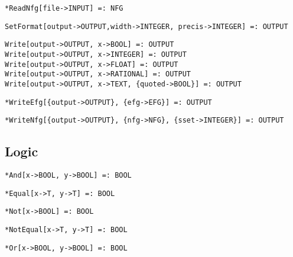 \protect \large \begin{verbatim}
*ReadNfg[file->INPUT] =: NFG
\end{verbatim}\normalsize


\protect \large \begin{verbatim}
SetFormat[output->OUTPUT,width->INTEGER, precis->INTEGER] =: OUTPUT
\end{verbatim}\normalsize


\protect \large \begin{verbatim}
Write[output->OUTPUT, x->BOOL] =: OUTPUT 
Write[output->OUTPUT, x->INTEGER] =: OUTPUT
Write[output->OUTPUT, x->FLOAT] =: OUTPUT
Write[output->OUTPUT, x->RATIONAL] =: OUTPUT
Write[output->OUTPUT, x->TEXT, {quoted->BOOL}] =: OUTPUT
\end{verbatim}\normalsize


\protect \large \begin{verbatim}
*WriteEfg[{output->OUTPUT}, {efg->EFG}] =: OUTPUT
\end{verbatim}\normalsize


\protect \large \begin{verbatim}
*WriteNfg[{output->OUTPUT}, {nfg->NFG}, {sset->INTEGER}] =: OUTPUT
\end{verbatim}\normalsize



\medskip
\subsection{Logic}

\protect \large \begin{verbatim}
*And[x->BOOL, y->BOOL] =: BOOL
\end{verbatim} \normalsize


\protect \large \begin{verbatim}
*Equal[x->T, y->T] =: BOOL
\end{verbatim}\normalsize


\protect \large \begin{verbatim}
*Not[x->BOOL] =: BOOL
\end{verbatim}\normalsize


\protect \large \begin{verbatim}
*NotEqual[x->T, y->T] =: BOOL
\end{verbatim}\normalsize


\protect \large \begin{verbatim}
*Or[x->BOOL, y->BOOL] =: BOOL
\end{verbatim} \normalsize


